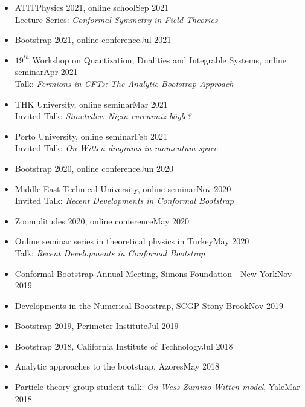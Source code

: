 \documentclass[a4paper,11pt]{article}
\begin{document}
\begin{itemize}[itemsep=.001em]
	\item[] ATITPhysics 2021, online school\hfill Sep 2021\\
	\hspace*{1.8em}Lecture Series: \emph{Conformal Symmetry in Field Theories}
	\item[] Bootstrap 2021, online conference\hfill Jul 2021
	\item[] $19^{th}$ Workshop on
	Quantization, Dualities and Integrable Systems, online seminar\hfill Apr 2021
	\\
	\hspace*{1.8em}Talk: \emph{Fermions in CFTs: The Analytic Bootstrap Approach}
	\item[] THK University, online seminar\hfill Mar 2021
\\
\hspace*{1.8em}Invited Talk: \emph{Simetriler: Niçin evrenimiz böyle?}
	\item[] Porto University, online seminar\hfill Feb 2021
\\
\hspace*{1.8em}Invited Talk: \emph{On Witten diagrams in momentum space}
	\item[] Bootstrap 2020, online conference\hfill Jun 2020
	\item[] Middle East Technical University, online seminar\hfill Nov 2020\\
\hspace*{1.8em} Invited Talk: \emph{Recent Developments in Conformal Bootstrap}
	\item[] Zoomplitudes 2020, online conference\hfill May 2020
	\item[] Online seminar series in theoretical physics in Turkey\hfill May 2020\\
	\hspace*{1.8em}Talk: \emph{Recent Developments in Conformal Bootstrap}
	\item[] Conformal Bootstrap Annual Meeting, Simons Foundation - New York\hfill Nov 2019
	\item[] Developments in the Numerical Bootstrap, SCGP-Stony Brook\hfill Nov 2019\\
	\item[] Bootstrap 2019, Perimeter Institute\hfill Jul 2019
	\item[]Bootstrap 2018, California Institute of Technology\hfill  Jul 2018
	\item[] Analytic approaches to the bootstrap, Azores\hfill May 2018
	\item[] Particle theory group student talk: \emph{On Wess-Zumino-Witten model}, Yale\hfill Mar 2018

\end{itemize}
\end{document}
